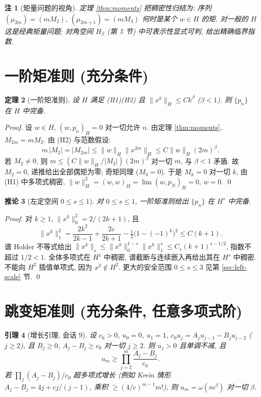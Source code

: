 \documentclass[UTF8]{ctexart}
\newtheorem{theorem}{定理}[section]
\newtheorem{lemma}[theorem]{引理}
\newtheorem{corollary}[theorem]{推论}
\newtheorem{remark}[theorem]{注}
\begin{document}
\begin{remark}[矩量问题的视角]
	定理 \ref{thm:moments} 把稠密性归结为: 序列 $(\mu_{2m}) = (mM_2)$, $(\mu_{2m+1}) = (mM_3)$
	何时是某个 $w \in H$ 的矩. 对一般的 $H$ 这是经典矩量问题; 对角空间
	$H_\beta$ (第 5 节) 中可表示性显式可判, 给出精确临界指数.
\end{remark}

\section{一阶矩准则 (充分条件)}

\begin{theorem}[一阶矩准则]\label{thm:first}
	设 $H$ 满足 (H1)(H2) 且 $\|x^k\|_H \leq C k^\beta$ ($\beta < 1$).
	则 $\{p_n\}$ 在 $H$ 中完备.
\end{theorem}

\begin{proof}
	设 $w \in H$, $(w, p_n)_H = 0$ 对一切允许 $n$. 由定理 \ref{thm:moments},
	$M_{2m} = mM_2$. 由 (H2) 与范数假设:
	\[
		m\,|M_2| = |M_{2m}| \leq \|w\|_H \|x^{2m}\|_H \leq C\|w\|_H (2m)^\beta .
	\]
	若 $M_2 \neq 0$, 则 $m \leq (C\|w\|_H/|M_2|)(2m)^\beta$ 对一切 $m$,
	与 $\beta < 1$ 矛盾. 故 $M_2 = 0$, 递推给出全部偶矩为零; 奇矩同理
	($M_3 = 0$). 于是 $M_k = 0$ 对一切 $k$, 由 (H1) 中多项式稠密,
	$\|w\|_H^2 = (w, w)_H = \lim (w, p_N)_H = 0$, $w = 0$. \qed
\end{proof}

\begin{corollary}[左定空间 $0\le s\le1$]
对 $0\le s\le1$, 一阶矩准则给出 $\{p_n\}$ 在 $H^s$ 中完备.
\end{corollary}
\begin{proof}
对 $k\ge1$, $\|x^k\|_0^2=2/(2k+1)$, 且
\[
 \|x^k\|_1^2=\frac{2k^2}{2k-1}+\frac{2c}{2k+1}
 -\tfrac12\bigl(1-(-1)^k\bigr)^2\le C(k+1).
\]
谱 Holder 不等式给出
$\|x^k\|_s\le\|x^k\|_0^{1-s}\|x^k\|_1^s
\le C_s(k+1)^{s-1/2}$, 指数不超过 $1/2<1$.
全体多项式在 $H^1$ 中稠密, 谱截断与连续嵌入再给出其在 $H^s$ 中稠密.
不能向 $H^2$ 插值单项式, 因为 $x^2\notin H^2$.
更大的安全范围 $0\le s\le3$ 见第 \ref{sec:left-scale} 节. \qed
\end{proof}

\section{跳变矩准则 (充分条件, 任意多项式阶)}

\begin{lemma}[增长引理, 会话 9]\label{lem:growth}
	设 $c_0 > 0$, $u_0 = 0$, $u_1 = 1$, $c_0 u_j = A_j u_{j-1} - B_j u_{j-2}$
	($j \geq 2$), 且 $B_j\ge0$, $A_j - B_j \geq c_0$ 对一切 $j \geq 2$. 则 $u_j > 0$
	且单调不减, 且
	\[
		u_m \geq \prod_{j=2}^{m} \frac{A_j - B_j}{c_0} .
	\]
	若 $\prod_j (A_j - B_j)/c_0$ 超多项式增长 (例如 Krein 情形
	$A_j - B_j = 4j + cj/(j-1)$, 乘积 $\geq (4/c)^{m-1}m!$),
	则 $u_m = \omega(m^\beta)$ 对一切 $\beta$.
\end{lemma}
\end{document}
